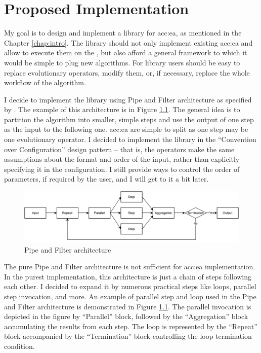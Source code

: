 \chapter{Proposed Implementation}
\label{chap:impl}

My goal is to design and implement a library for \acrlong{acc:ea}, as mentioned in the Chapter \ref{chap:intro}. The library should not only implement existing \acrshort{acc:ea} and allow to execute them on the \gpuns, but also afford a general framework to which it would be simple to plug new algorithms. For library users should be easy to replace evolutionary operators, modify them, or, if necessary, replace the whole workflow of the algorithm.

I decide to implement the library using Pipe and Filter architecture as specified by \citet{EnterpriseIntegrationPatterns}. The example of this architecture is in Figure \ref{fig:pipesandfilters}. The general idea is to partition the algorithm into smaller, simple steps and use the output of one step as the input to the following one. \acrshort{acc:ea} are simple to split as one step may be one evolutionary operator. I decided to implement the library in the \enquote{Convention over Configuration} design pattern -- that is, the operators make the same assumptions about the format and order of the input, rather than explicitly specifying it in the configuration. I still provide ways to control the order of parameters, if required by the user, and I will get to it a bit later.

\begin{figure}
    \centering
    \includegraphics[width=\textwidth]{img/PipesAndFilters.pdf}
    \caption{Pipe and Filter architecture}
    \label{fig:pipesandfilters}
\end{figure}

The pure Pipe and Filter architecture is not sufficient for \acrshort{acc:ea} implementation. In the purest implementation, this architecture is just a chain of steps following each other. I decided to expand it by numerous practical steps like loops, parallel step invocation, and more. An example of parallel step and loop used in the Pipe and Filter architecture is demonstrated in Figure \ref{fig:pipesandfilters}. The parallel invocation is depicted in the figure by \enquote{Parallel} block, followed by the \enquote{Aggregation} block accumulating the results from each step. The loop is represented by the \enquote{Repeat} block accompanied by the \enquote{Termination} block controlling the loop termination condition.

